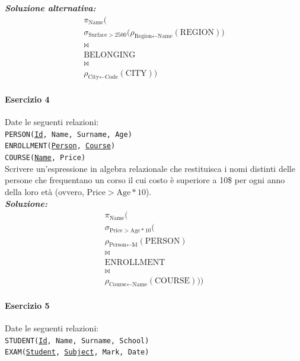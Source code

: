 \documentclass[12pt]{extarticle}
\begin{document}
\noindent \textbf{\textit{Soluzione alternativa:}}
\[
\begin{gathered}
\pi_{\text{Name}} \Big( \\
\sigma_{\text{Surface} > 2500} \big( \rho_{\text{Region} \leftarrow \text{Name}}(\text{REGION}) \big) \\
\bowtie \\
\text{BELONGING} \\
\bowtie \\
\rho_{\text{City} \leftarrow \text{Code}}(\text{CITY}) \Big)
\end{gathered}
\]

\paragraph{Esercizio 4} Date le seguenti relazioni:\\

\noindent \texttt{PERSON(\underline{Id}, Name, Surname, Age)}\\
\texttt{ENROLLMENT(\underline{Person}, \underline{Course})}\\
\texttt{COURSE(\underline{Name}, Price)}\\[0.5em]

\noindent Scrivere un'espressione in algebra relazionale che restituisca i nomi distinti delle persone che frequentano un corso il cui costo è superiore a 10\$ per ogni anno della loro età (ovvero, $\text{Price} > \text{Age} * 10$).\\

\noindent \textbf{\textit{Soluzione:}}
\[
\begin{gathered}
\pi_{\text{Name}} \Big( \\
\sigma_{\text{Price} > \text{Age} * 10} \big( \\
\rho_{\text{Person} \leftarrow \text{Id}}(\text{PERSON}) \\
\bowtie \\
\text{ENROLLMENT} \\
\bowtie \\
\rho_{\text{Course} \leftarrow \text{Name}}(\text{COURSE}) \big) \Big)
\end{gathered}
\]

\paragraph{Esercizio 5} Date le seguenti relazioni:\\

\noindent \texttt{STUDENT(\underline{Id}, Name, Surname, School)}\\
\texttt{EXAM(\underline{Student}, \underline{Subject}, Mark, Date)}\\[0.5em]
\end{document}
